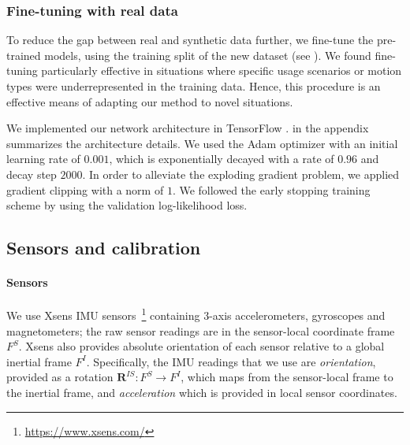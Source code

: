 \documentclass[acmtog]{acmart}
\begin{document}
\subsubsection{Fine-tuning with real data} 
To reduce the gap between real and synthetic data further, we fine-tune the pre-trained models, using the training split of the new dataset (see ). We found fine-tuning particularly effective in situations where specific usage scenarios or motion types were underrepresented in the training data. Hence, this procedure is an effective means of adapting our method to novel situations. 

We implemented our network architecture in TensorFlow \cite{tensorflow2015-whitepaper}.  in the appendix summarizes the architecture details. We used the Adam optimizer \cite{kingma2014adam} with an initial learning rate of $0.001$, which is exponentially decayed with a rate of $0.96$ and decay step $2000$. In order to alleviate the exploding gradient problem, we applied gradient clipping with a norm of $1$. We followed the early stopping training scheme by using the validation log-likelihood loss.

\subsection{Sensors and calibration}\label{sec:calibration}\paragraph{Sensors} We use Xsens IMU sensors~\footnote{\url{https://www.xsens.com/}} containing 3-axis accelerometers, gyroscopes and magnetometers; the raw sensor readings are in the sensor-local coordinate frame $F^S$. Xsens also  provides absolute orientation of each sensor relative to a global inertial frame $F^I$. Specifically, the IMU readings that we use are \emph{orientation}, provided as a rotation $\mathbf{R}^{IS} : F^S \rightarrow F^I$, which maps from the sensor-local frame to the inertial frame, and \emph{acceleration} which is provided in local sensor coordinates.
\end{document}
